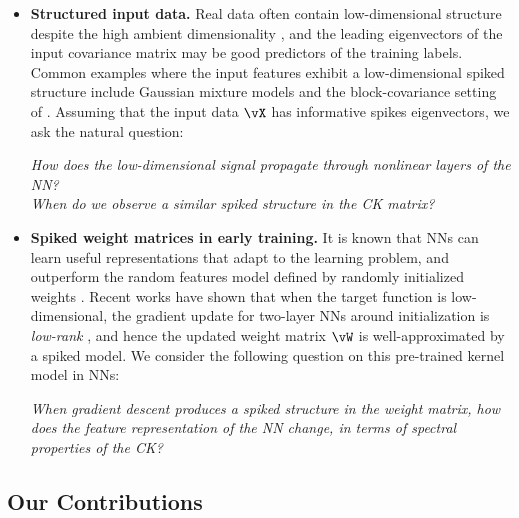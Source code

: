 \begin{itemize}[leftmargin=*]
    \item \textbf{Structured input data.} Real data often contain low-dimensional structure despite the high ambient dimensionality \citep{lee2007nonlinear,hastie2009elements,pope2021intrinsic}, and the leading eigenvectors of the input covariance matrix may be good predictors of the training labels. 
    Common examples where the input features exhibit a low-dimensional spiked structure include
Gaussian mixture models \citep{loureiro2021learning,refinetti2021classifying,arous2023high1} and the
block-covariance setting of \citep{ghorbani2020neural,ba2023learning,mousavi2023gradient}. Assuming that the input data $\vX$ has informative spikes
eigenvectors, we ask the natural question: 
    \vspace{-1.mm}
    \begin{center}
        \textit{
        How does the low-dimensional signal propagate through nonlinear layers
of the NN? \\ When do we observe a similar spiked structure in the CK matrix? }
    \end{center}
    \item \textbf{Spiked weight matrices in early training.} It is known that NNs can
learn useful representations that adapt to the learning problem, and outperform
the random features model defined by randomly initialized weights \citep{ghorbani2019limitations,wei2019regularization,abbe2022merged}. 
    Recent works have shown that when the target function is low-dimensional,
the gradient update for two-layer NNs around initialization is \textit{low-rank}
\citep{ba2022high,damian2022neural,wang2022spectral}, and hence the updated weight matrix $\vW$
is well-approximated by a spiked model. We consider the following question on this pre-trained kernel model in NNs: 
    \vspace{-1.mm}
    \begin{center}
        \textit{
        When gradient descent produces a spiked structure in the weight matrix,
how does the feature representation of the NN change, in terms of spectral properties of the CK?}
    \end{center}
\end{itemize}

\subsection{Our Contributions}


